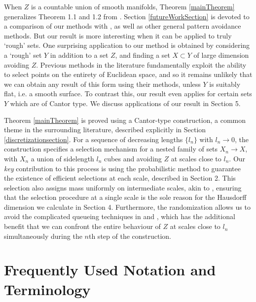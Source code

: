 \documentclass[dvipsnames,letterpaper,12pt]{article}
\numberwithin{equation}{section}
\theoremstyle{plain}
\begin{document}

When $Z$ is a countable union of smooth manifolds, Theorem \ref{mainTheorem} generalizes Theorem 1.1 and 1.2 from \cite{MalabikaRob}. Section \ref{futureWorkSection} is devoted to a comparison of our methods with \cite{MalabikaRob}, as well as other general pattern avoidance methods. But our result is more interesting when it can be applied to truly `rough' sets. One surprising application to our method is obtained by considering a `rough' set $Y$ in addition to a set $Z$, and finding a set $X \subset Y$ of large dimension avoiding $Z$. Previous methods in the literature fundamentally exploit the ability to select points on the entirety of Euclidean space, and so it remains unlikely that we can obtain any result of this form using their methods, unless $Y$ is suitably flat, i.e. a smooth surface. To contrast this, our result even applies for certain sets $Y$ which are of Cantor type. We discuss applications of our result in Section 5.

Theorem \ref{mainTheorem} is proved using a Cantor-type construction, a common theme in the surrounding literature, described explicitly in Section \ref{discretizationsection}. For a sequence of decreasing lengths $\{ l_n \}$ with $l_n \to 0$, the construction specifies a selection mechanism for a nested family of sets $X_n \to X$, with $X_n$ a union of sidelength $l_n$ cubes and avoiding $Z$ at scales close to $l_n$. Our {\it key} contribution to this process is using the probabilistic method to guarantee the existence of efficient selections at each scale, described in Section 2. This selection also assigns mass uniformly on intermediate scales, akin to \cite{MalabikaRob}, ensuring that the selection procedure at a single scale is the sole reason for the Hausdorff dimension we calculate in Section 4. Furthermore, the randomization allows us to avoid the complicated queueing techniques in \cite{KeletiDimOneSet} and \cite{MalabikaRob}, which has the additional benefit that we can confront the entire behaviour of $Z$ at scales close to $l_n$ simultaneously during the $n$th step of the construction.










\section{Frequently Used Notation and Terminology}\label{notationSection}
\end{document}
